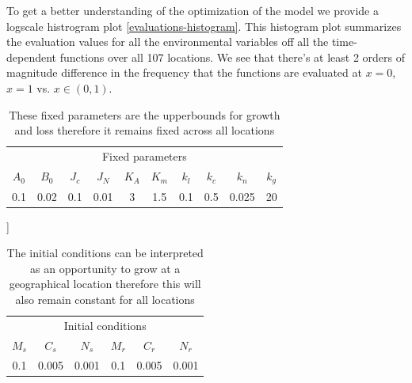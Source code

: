 \documentclass[paper=a4, fontsize=11pt]{scrartcl}
\numberwithin{equation}{section}		%
\numberwithin{figure}{section}			%
\numberwithin{table}{section}				%
\begin{document}
To get a better understanding of the optimization of the model we provide a logscale histrogram plot \ref{evaluations-histogram}. This histogram plot summarizes the evaluation values for all the environmental variables off all the time-dependent functions over all 107 locations. We see that there's at least 2 orders of magnitude difference in the frequency that the functions are evaluated at $x = 0$, $ x = 1$ vs. $x \in (0,1)$. 
\vspace{1cm}
\begin{table}
\begin{center}
\begin{tabular}{|c c c c c c c c c c|}
\multicolumn{10}{|c|}{Fixed parameters} \\
 $A_0$ & $B_0$ & $J_c$ & $J_N$ & $K_A$ & $K_m$ & $k_l$ & $k_c$ & $k_n$  & $k_g$    \\ 
 0.1 & 0.02 & 0.1 & 0.01 & 3 & 1.5 & 0.1 & 0.5 & 0.025 & 20
\end{tabular}
\caption{ These fixed parameters are the upperbounds for growth  and loss therefore it remains fixed across all locations}
\label{fixed-parameters}
\end{center}
\end{table}
\vspace{-1cm}
\begin{table}]
\begin{center}
\begin{tabular}{|c c c c c c|}
\multicolumn{6}{|c|}{Initial conditions} \\
 $M_s$ & $C_s$ & $N_s$ & $M_r$ & $C_r$ & $N_r$ \\ 
 0.1 & 0.005 & 0.001 & 0.1 & 0.005 & 0.001  
\end{tabular}
\caption{ The initial conditions can be interpreted as an opportunity to grow at a geographical location therefore this will also remain constant for all locations}
\label{initial-conditions}
\end{center}
\end{table}
\end{document}
